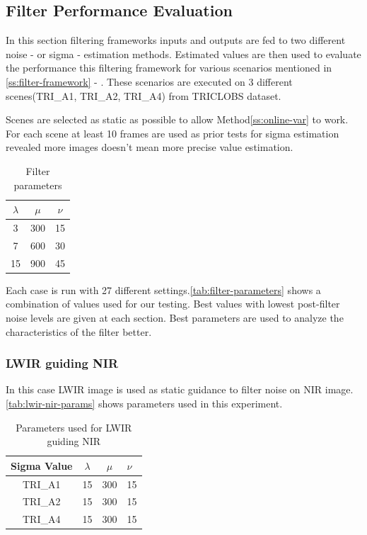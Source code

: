 \documentclass[10pt,twocolumn,letterpaper]{article}
\begin{document}
\subsection{Filter Performance Evaluation}
In this section filtering frameworks inputs and outputs are fed to two different noise - or sigma - estimation methods. Estimated values are then used to evaluate the performance this filtering framework for various scenarios mentioned in  \ref{ss:filter-framework} -  . These scenarios are executed on 3 different scenes(TRI\_A1, TRI\_A2, TRI\_A4) from TRICLOBS\cite{triclobs} dataset. 

Scenes are selected as static as possible to allow Method\ref{ss:online-var} to work. For each scene at least 10 frames are used as prior tests for sigma estimation revealed more images doesn't mean more precise value estimation.
\begin{table}[!h]
	\centering
	\caption{Filter parameters}
	\label{tab:filter-parameters}
	\begin{tabular}{ccc}
		\hline
		\(\lambda\) & \(\mu\) & \(\nu\) \\ \hline
		3           & 300     & 15      \\
		7           & 600     & 30      \\
		15          & 900     & 45      \\ \hline
	\end{tabular}
\end{table}

Each case is run with 27 different settings.\autoref{tab:filter-parameters} shows a combination of values used for our testing. Best values with lowest post-filter noise levels are given at each section.
Best parameters are used to analyze the characteristics of the filter better.
\subsubsection{LWIR guiding NIR}
In this case LWIR image is used as static guidance to filter noise on NIR image. \autoref{tab:lwir-nir-params} shows parameters used in this experiment.
\begin{table}[!ht]
	\centering
	\caption{Parameters used for LWIR guiding NIR}
	\label{tab:lwir-nir-params}
	\begin{tabular}{@{}cccl@{}}
		\toprule
		\bfseries Sigma Value & \(\lambda\) & \(\mu\) & \(\nu\) \\ \midrule
		TRI\_A1               & 15        	& 300	  & 15       \\
		TRI\_A2               & 15       	& 300	  & 15       \\
		TRI\_A4               & 15        	& 300	  & 15       \\ \bottomrule
	\end{tabular}
\end{table}
\end{document}

